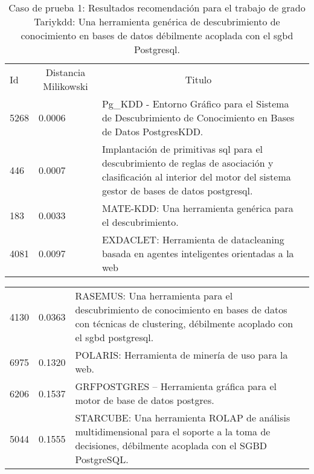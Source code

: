 \begin{table}[H]\centering
\caption{Caso de prueba 1: Resultados recomendación para el trabajo de grado Tariykdd: Una herramienta genérica de descubrimiento de conocimiento en bases de datos débilmente acoplada con el sgbd Postgresql.}\label{tab:tablae1}
	\begin{tabularx}{\textwidth}{XXXm{3.0cm}}\toprule

Id &  \multicolumn{1}{c}{Distancia Milikowski } & \multicolumn{1}{c}{Titulo} \\ 
5268 &0.0006 &Pg\_KDD - Entorno Gráfico para el Sistema de Descubrimiento de 
Conocimiento en Bases de Datos PostgresKDD.   \\ 
446 &  0.0007 &Implantación de primitivas sql para el descubrimiento de reglas de asociación y clasificación al interior del motor del sistema gestor de bases de datos postgresql.   \\ 
183 & 0.0033 &MATE-KDD: Una herramienta genérica para el descubrimiento.   \\ 
4081 &0.0097&EXDACLET: Herramienta de datacleaning basada en agentes inteligentes orientadas a la web \\

 \bottomrule
	\end{tabularx}
	
\end{table}

\begin{table}[H]\centering
\label{tab:tablae1}
	\begin{tabularx}{\textwidth}{XXXm{3.0cm}}\toprule

4130 & 0.0363  &RASEMUS: Una herramienta para el descubrimiento de conocimiento en bases de datos con técnicas de clustering, débilmente acoplado con el sgbd postgresql. \\ 
6975&0.1320&POLARIS: Herramienta de minería de uso para la web. \\
6206&0.1537&GRFPOSTGRES – Herramienta gráfica para el motor de base de datos postgres.\\
5044&0.1555&STARCUBE: Una herramienta ROLAP de análisis multidimensional para el soporte a la toma de decisiones, débilmente acoplada con el SGBD PostgreSQL. \\
 \bottomrule
	\end{tabularx}
	
\end{table}

